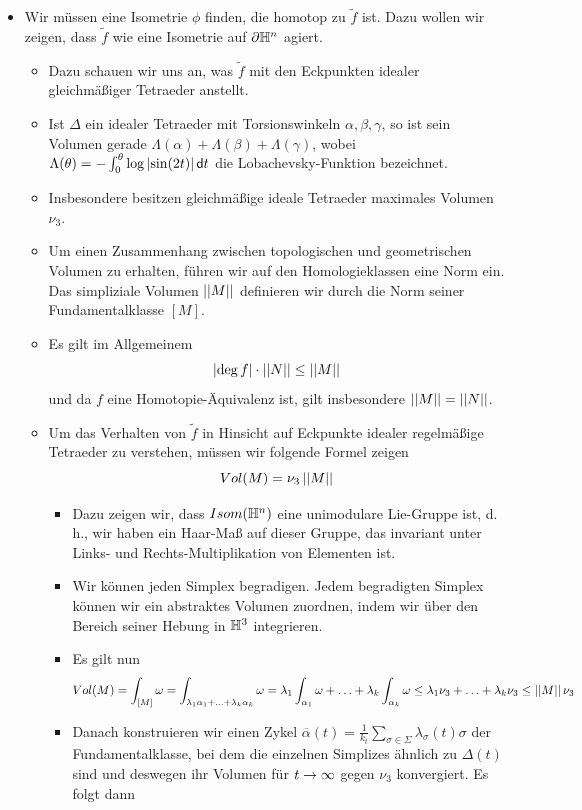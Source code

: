 \documentclass{book}
\renewcommand{\d}{\textsf{d}}
\begin{document}
\begin{itemize}
\item Wir müssen eine Isometrie $\phi$ finden, die homotop zu $\widetilde{f}$ ist. Dazu wollen wir zeigen, dass $\widetilde{f}$ wie eine Isometrie auf $\partial \mathbb{H}^n$ agiert.
\begin{itemize}
	\item Dazu schauen wir uns an, was $\widetilde{f}$ mit den Eckpunkten idealer gleichmäßiger Tetraeder anstellt.
	\item Ist $\Delta$ ein idealer Tetraeder mit Torsionswinkeln $\alpha, \beta, \gamma$, so ist sein Volumen gerade $\Lambda(\alpha) + \Lambda(\beta) + \Lambda(\gamma)$, wobei $\Lambda(\theta) = - \int_{0}^{\theta}\log \bet{ \sin(2t) } \d t$ die Lobachevsky-Funktion bezeichnet.
	\item Insbesondere besitzen gleichmäßige ideale Tetraeder maximales Volumen $\nu_3$.
	\item Um einen Zusammenhang zwischen topologischen und geometrischen Volumen zu erhalten, führen wir auf den Homologieklassen eine Norm ein. Das {simpliziale Volumen} $\left|\left|M\right|\right|$ definieren wir durch die Norm seiner Fundamentalklasse $[M]$.
	\item Es gilt im Allgemeinem
	\[\left|\deg f\right|\cdot \left|\left|N\right|\right| \leq \left|\left|M\right|\right| \]
	und da $f$ eine Homotopie-Äquivalenz ist, gilt insbesondere $\left|\left|M\right|\right| = \left|\left|N\right|\right|$.
	\item Um das Verhalten von $\widetilde{f}$ in Hinsicht auf Eckpunkte idealer regelmäßige Tetraeder zu verstehen, müssen wir folgende Formel zeigen
	\[ Vol(M) = \nu_3 \left|\left|M\right|\right| \]
	\begin{itemize}
		\item Dazu zeigen wir, dass $Isom(\mathbb{H}^n)$ eine unimodulare Lie-Gruppe ist, d.\,h., wir haben ein Haar-Maß auf dieser Gruppe, das invariant unter Links- und Rechts-Multiplikation von Elementen ist.
		\item Wir können jeden Simplex begradigen. Jedem begradigten Simplex können wir ein abstraktes Volumen zuordnen, indem wir über den Bereich seiner Hebung in $\mathbb{H}^3$ integrieren.
		\item Es gilt nun
		\[  Vol(M) = \int_{[M]}\omega = \int_{\lambda_1 \alpha_1 + \ldots + \lambda_k \alpha_k} \omega = \lambda_1 \int_{\alpha_1} \omega + \ldots + \lambda_k \int_{\alpha_k}\omega \leq \lambda_1 \nu_3 + \ldots +\lambda_k \nu_3 \leq \left|\left|M\right|\right| \nu_3 \]
		\item Danach konstruieren wir einen Zykel $\overline{\alpha}(t) = \frac{1}{k_t} \sum_{\sigma \in \Sigma}\lambda_\sigma(t) \sigma$ der Fundamentalklasse, bei dem die einzelnen Simplizes ähnlich zu $\Delta(t)$ sind und deswegen ihr Volumen für $t\overset{}{\rightarrow} \infty$ gegen $\nu_3$ konvergiert. Es folgt dann

\end{itemize}
\end{itemize}
\end{itemize}
\end{document}
